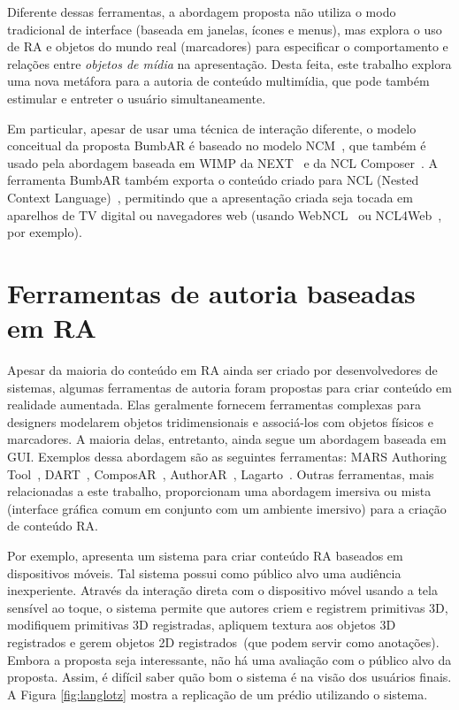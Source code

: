 \documentclass[../main.tex]{subfiles}
\begin{document}
Diferente dessas ferramentas, a abordagem proposta não utiliza o modo tradicional de interface (baseada em janelas, ícones e menus), mas explora o uso de RA e objetos do mundo real (marcadores) para especificar o comportamento e relações entre \emph{objetos de mídia} na apresentação. Desta feita, este trabalho explora uma nova metáfora para a autoria de conteúdo multimídia, que pode também estimular e entreter o usuário simultaneamente.

Em particular, apesar de usar uma técnica de interação diferente, o modelo conceitual da proposta BumbAR é baseado no modelo NCM~\cite{soares_nested_2005}, que também é usado pela abordagem baseada em WIMP da NEXT~\cite{paulo_de_mattos_next_2013} e da NCL Composer~\cite{azevedo_composer_2014}. A ferramenta BumbAR também exporta o conteúdo criado para NCL (Nested Context Language)~\cite{soares2009programando}, permitindo que a apresentação criada seja tocada em aparelhos de TV digital ou navegadores web (usando WebNCL~\cite{melo_webncl_2012} ou NCL4Web~\cite{silva_ncl4web_2013}, por exemplo).

\section{Ferramentas de autoria baseadas em RA}
\label{sec:ferramentas_ra}

Apesar da maioria do conteúdo em RA ainda ser criado por desenvolvedores de sistemas, algumas ferramentas de autoria foram propostas para criar conteúdo em realidade aumentada. Elas geralmente fornecem ferramentas complexas para designers modelarem objetos tridimensionais e associá-los com objetos físicos e marcadores. A maioria delas, entretanto, ainda segue um abordagem baseada em GUI. Exemplos dessa abordagem são as seguintes ferramentas: MARS Authoring Tool~\cite{sinem_authoring_2003}, DART~\cite{macintyre_dart_2004}, ComposAR~\cite{seichter_composar_2008}, AuthorAR~\cite{lucrecia_authorar_2013}, Lagarto~\cite{maia_lagarto_2017}. Outras ferramentas, mais relacionadas a este trabalho, proporcionam uma abordagem imersiva ou mista (interface gráfica comum em conjunto com um ambiente imersivo) para a criação de conteúdo RA.

Por exemplo,  apresenta um sistema para criar conteúdo RA baseados em dispositivos móveis. Tal sistema possui como público alvo uma audiência inexperiente. Através da interação direta com o dispositivo móvel usando a tela sensível ao toque, o sistema permite que autores criem e registrem primitivas 3D, modifiquem primitivas 3D registradas, apliquem textura aos objetos 3D registrados e gerem objetos 2D registrados~(que podem servir como anotações). Embora a proposta seja interessante, não há uma avaliação com o público alvo da proposta. Assim, é difícil saber quão bom o sistema é na visão dos usuários finais. A Figura \ref{fig:langlotz} mostra a replicação de um prédio utilizando o sistema. 
\end{document}
